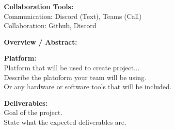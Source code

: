 \documentclass[12pt, A4]{article}
\begin{document}
\vspace{38mm} %
\textbf{Collaboration Tools:}\\ %
Communication: Discord (Text), Teams (Call)\\ %
Collaboration: Github, Discord

\vspace{5mm}

\textbf{Overview / Abstract:}\\	
\lipsum[1]

\vspace{5mm}


\textbf{Platform:}\\
Platform that will be used to create project...\\
Describe the platoform your team will be using.\\
Or any hardware or software tools that will be included.

\vspace{5mm}

\textbf{Deliverables:}\\
Goal of the project.\\
State what the expected deliverables are.
\end{document}
